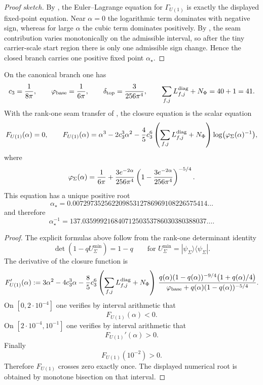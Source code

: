 \begin{proof}[Proof sketch]
By , the Euler--Lagrange equation for
$\Gamma_{U(1)}$ is exactly the displayed fixed-point equation. Near $\alpha=0$ the logarithmic term
dominates with negative sign, whereas for large $\alpha$ the cubic term dominates positively. By
, the seam contribution varies monotonically on the admissible interval, so
after the tiny carrier-scale start region there is only one admissible sign change. Hence the
closed branch carries one positive fixed point $\alpha_\star$.
\end{proof}

\fi

\begin{theorem}
\label{thm:exact-electromagnetic-closure}
\label{thm:alpha-canonical}
On the canonical branch one has
\[
c_3=\frac{1}{8\pi},
\qquad
\varphi_{\mathrm{base}}=\frac{1}{6\pi},
\qquad
\delta_{\mathrm{top}}=\frac{3}{256\pi^4},
\qquad
\sum_{f,j}L_{f,j}^{\mathrm{diag}}+N_\Phi=40+1=41.
\]
With the rank-one seam transfer of , the closure equation
is the scalar equation
\begin{equation}
\label{eq:carrier-cfe}
F_{U(1)}(\alpha)=0,
\qquad
F_{U(1)}(\alpha)=\alpha^3-2c_3^3\alpha^2-\frac45c_3^6
\left(\sum_{f,j}L_{f,j}^{\mathrm{diag}}+N_\Phi\right)\log\bigl(\varphi_{\Sigma}(\alpha)^{-1}\bigr),
\end{equation}
where
\[
\varphi_{\Sigma}(\alpha)=\frac{1}{6\pi}+\frac{3e^{-2\alpha}}{256\pi^4}
\left(1-\frac{3e^{-2\alpha}}{256\pi^4}\right)^{-5/4}.
\]
This equation has a unique positive root
\[
\alpha_{\star}=0.00729735256220985312786969108226575414\dots
\]
and therefore
\[
\alpha_{\star}^{-1}=137.03599921684071250353786030380388037\dots.
\]
\end{theorem}

\begin{proof}
The explicit formulas above follow from the rank-one determinant identity
\[
\det(1-qU_{\Sigma}^{\min})=1-q
\qquad
\text{for } U_{\Sigma}^{\min}=|\psi_{\Sigma}\rangle\langle\psi_{\Sigma}|.
\]
The derivative of the closure function is
\[
F_{U(1)}'(\alpha)
:=
3\alpha^2-4c_3^3\alpha
-\frac85c_3^6\left(\sum_{f,j}L_{f,j}^{\mathrm{diag}}+N_\Phi\right)\,
\frac{q(\alpha)(1-q(\alpha))^{-9/4}\bigl(1+q(\alpha)/4\bigr)}
{\varphi_{\mathrm{base}}+q(\alpha)(1-q(\alpha))^{-5/4}}.
\]
On $[0,2\cdot 10^{-4}]$ one verifies by interval arithmetic that
\[
F_{U(1)}(\alpha)<0.
\]
On $[2\cdot 10^{-4},10^{-1}]$ one verifies by interval arithmetic that
\[
F_{U(1)}'(\alpha)>0.
\]
Finally
\[
F_{U(1)}(10^{-2})>0.
\]
Therefore $F_{U(1)}$ crosses zero exactly once. The displayed numerical root is obtained by
monotone bisection on that interval.
\end{proof}

